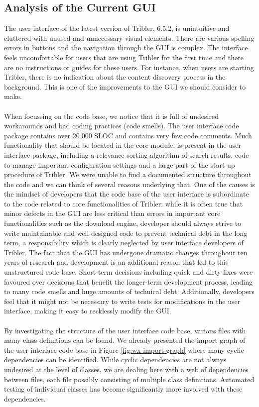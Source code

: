 \subsection{Analysis of the Current GUI}
The user interface of the latest version of Tribler, 6.5.2, is unintuitive and cluttered with unused and unnecessary visual elements. There are various spelling errors in buttons and the navigation through the GUI is complex. The interface feels uncomfortable for users that are using Tribler for the first time and there are no instructions or guides for these users. For instance, when users are starting Tribler, there is no indication about the content discovery process in the background. This is one of the improvements to the GUI we should consider to make.\\\\
When focussing on the code base, we notice that it is full of undesired workarounds and bad coding practices (code smells). The user interface code package contains over 20.000 SLOC and contains very few code comments. Much functionality that should be located in the core module, is present in the user interface package, including a relevance sorting algorithm of search results, code to manage important configuration settings and a large part of the start up procedure of Tribler. We were unable to find a documented structure throughout the code and we can think of several reasons underlying that. One of the causes is the mindset of developers that the code base of the user interface is subordinate to the code related to core functionalities of Tribler: while it is often true that minor defects in the GUI are less critical than errors in important core functionalities such as the download engine, developer should always strive to write maintainable and well-designed code to prevent technical debt in the long term, a responsibility which is clearly neglected by user interface developers of Tribler. The fact that the GUI has undergone dramatic changes throughout ten years of research and development is an additional reason that led to this unstructured code base. Short-term decisions including quick and dirty fixes were favoured over decisions that benefit the longer-term development process, leading to many code smells and huge amounts of technical debt. Additionally, developers feel that it might not be necessary to write tests for modifications in the user interface, making it easy to recklessly modify the GUI.\\\\
By investigating the structure of the user interface code base, various files with many class definitions can be found. We already presented the import graph of the user interface code base in Figure \ref{fig:wx-import-graph} where many cyclic dependencies can be identified. While cyclic dependencies are not always undesired at the level of classes, we are dealing here with a web of dependencies between files, each file possibly consisting of multiple class definitions. Automated testing of individual classes has become significantly more involved with these dependencies.\\\\
